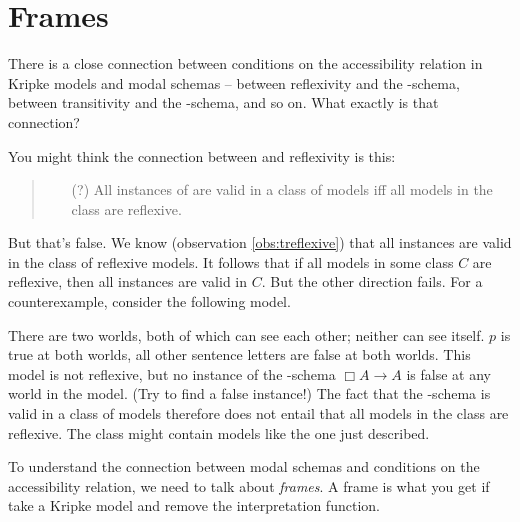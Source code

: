 

\section{Frames}\label{sec:frames}

There is a close connection between conditions on the accessibility relation in
Kripke models and modal schemas -- between reflexivity and the -schema,
between transitivity and the -schema, and so on. What exactly is that
connection?

You might think the connection between  and reflexivity is this:
\begin{quote}
  \begin{itemize}
    \item[(?)] All instances of  are valid in a class of models iff all
    models in the class are reflexive.
  \end{itemize}
\end{quote}
%
But that's false. We know (observation
\ref{obs:treflexive}) that all  instances are valid in the class of
reflexive models. It follows that if all models in some class $C$ are reflexive,
then all  instances are valid in $C$. But the other direction fails. For a
counterexample, consider the following model.
\begin{center}
\end{center}
There are two worlds, both of which can see each other; neither can see itself.
$p$ is true at both worlds, all other sentence letters are false at both worlds.
This model is not reflexive, but no instance of the -schema $\Box A \to A$
is false at any world in the model. (Try to find a false instance!) The fact
that the -schema is valid in a class of models therefore does not entail
that all models in the class are reflexive. The class might contain models like
the one just described.

To understand the connection between modal schemas and conditions on the
accessibility relation, we need to talk about \emph{frames}. A frame is what you
get if take a Kripke model and remove the interpretation function.

